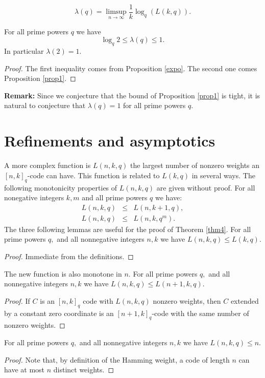 \documentclass[12pt]{article}
\theoremstyle{definition}
\begin{document}
$$ \lambda(q)=\limsup_{n \rightarrow \infty} \frac{1}{k}\log_q(L(k,q)) .$$

{\theorem For all prime powers $q$ we have $$\log_q 2 \le \lambda(q) \le 1.$$ In particular $\lambda(2)=1.$
}
\begin{proof}
The first inequality comes from Proposition \ref{expo}. The second one comes Proposition \ref{prop1}.
\end{proof}

{\bf Remark:} Since we conjecture that the bound of Proposition \ref{prop1} is tight, it is natural to conjecture that $\lambda(q)=1$ for all prime powers $q.$

\section{Refinements and asymptotics}

A more complex function is $L(n,k,q)$ the largest number of nonzero weights an $[n,k]_q$-code can have. This function is related to $L(k,q)$ in several ways.
The following monotonicity properties of $L(n,k,q)$ are given without proof.
{\prop For all nonegative integers $k,m$ and all prime powers $q$ we have:
\begin{eqnarray*}
L(n,k,q)&\le & L(n,k+1,q),\\
L(n,k,q)&\le & L(n,k,q^m).
\end{eqnarray*}
}
The three following lemmas are useful for the proof of Theorem \ref{thm4}.
{\lemma \label{1} For all prime powers $q,$ and all nonnegative integers $n,k$ we have
$L(n,k, q)\le L(k,q).$
}
\begin{proof}
Immediate from the definitions.
\end{proof}

The new function is also monotone in $n.$
{\lemma \label{2} For all prime powers $q,$ and all nonnegative integers $n,k$ we have
$L(n,k, q)\le L(n+1, k,q).$
}
\begin{proof}
If $C$ is an $[n,k]_q$ code with $L(n,k, q)$ nonzero weights, then $C$ extended by a constant zero coordinate is an $[n+1,k]_q$-code with the same number of nonzero weights.
\end{proof}

{\lemma \label{3} For all prime powers $q,$ and all nonnegative integers $n,k$ we have
$L(n,k, q)\le n.$
}
\begin{proof}
Note that, by definition of the Hamming weight, a code of length $n$ can have at most $n$ distinct weights.
\end{proof}
\end{document}
